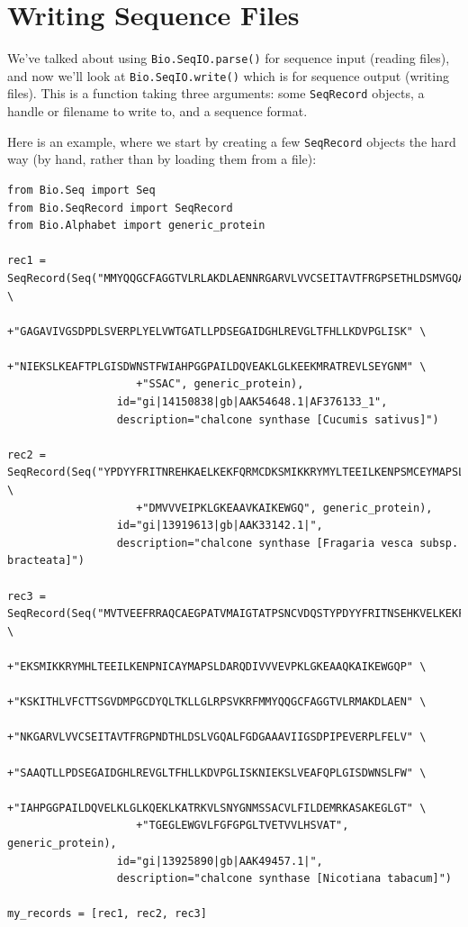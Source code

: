 \documentclass{report}
\begin{document}
\section{Writing Sequence Files}

We've talked about using \verb|Bio.SeqIO.parse()| for sequence input (reading files), and now we'll look at \verb|Bio.SeqIO.write()| which is for sequence output (writing files).  This is a function taking three arguments: some \verb|SeqRecord| objects, a handle or filename to write to, and a sequence format.

Here is an example, where we start by creating a few \verb|SeqRecord| objects the hard way (by hand, rather than by loading them from a file):

\begin{verbatim}
from Bio.Seq import Seq
from Bio.SeqRecord import SeqRecord
from Bio.Alphabet import generic_protein

rec1 = SeqRecord(Seq("MMYQQGCFAGGTVLRLAKDLAENNRGARVLVVCSEITAVTFRGPSETHLDSMVGQALFGD" \
                    +"GAGAVIVGSDPDLSVERPLYELVWTGATLLPDSEGAIDGHLREVGLTFHLLKDVPGLISK" \
                    +"NIEKSLKEAFTPLGISDWNSTFWIAHPGGPAILDQVEAKLGLKEEKMRATREVLSEYGNM" \
                    +"SSAC", generic_protein),
                 id="gi|14150838|gb|AAK54648.1|AF376133_1",
                 description="chalcone synthase [Cucumis sativus]")

rec2 = SeqRecord(Seq("YPDYYFRITNREHKAELKEKFQRMCDKSMIKKRYMYLTEEILKENPSMCEYMAPSLDARQ" \
                    +"DMVVVEIPKLGKEAAVKAIKEWGQ", generic_protein),
                 id="gi|13919613|gb|AAK33142.1|",
                 description="chalcone synthase [Fragaria vesca subsp. bracteata]")

rec3 = SeqRecord(Seq("MVTVEEFRRAQCAEGPATVMAIGTATPSNCVDQSTYPDYYFRITNSEHKVELKEKFKRMC" \
                    +"EKSMIKKRYMHLTEEILKENPNICAYMAPSLDARQDIVVVEVPKLGKEAAQKAIKEWGQP" \
                    +"KSKITHLVFCTTSGVDMPGCDYQLTKLLGLRPSVKRFMMYQQGCFAGGTVLRMAKDLAEN" \
                    +"NKGARVLVVCSEITAVTFRGPNDTHLDSLVGQALFGDGAAAVIIGSDPIPEVERPLFELV" \
                    +"SAAQTLLPDSEGAIDGHLREVGLTFHLLKDVPGLISKNIEKSLVEAFQPLGISDWNSLFW" \
                    +"IAHPGGPAILDQVELKLGLKQEKLKATRKVLSNYGNMSSACVLFILDEMRKASAKEGLGT" \
                    +"TGEGLEWGVLFGFGPGLTVETVVLHSVAT", generic_protein),
                 id="gi|13925890|gb|AAK49457.1|",
                 description="chalcone synthase [Nicotiana tabacum]")
               
my_records = [rec1, rec2, rec3]
\end{verbatim}
\end{document}
